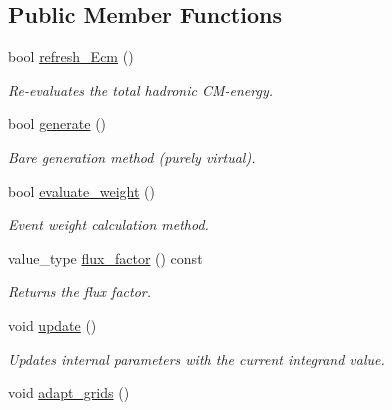 \subsection*{Public Member Functions}
\begin{DoxyCompactItemize}
\item 
\hypertarget{a00263_a43bb6829df157ce9165fc076aa86c6b3}{}bool \hyperlink{a00263_a43bb6829df157ce9165fc076aa86c6b3}{refresh\+\_\+\+Ecm} ()\label{a00263_a43bb6829df157ce9165fc076aa86c6b3}

\begin{DoxyCompactList}\small\item\em Re-\/evaluates the total hadronic C\+M-\/energy. \end{DoxyCompactList}\item 
bool \hyperlink{a00263_aca3cda0f673678362fbf0300fbbc3357}{generate} ()
\begin{DoxyCompactList}\small\item\em \textquotesingle{}Bare generation\textquotesingle{} method (purely virtual). \end{DoxyCompactList}\item 
\hypertarget{a00263_a439c9559e576d22aeffb909bfa0a5269}{}bool \hyperlink{a00263_a439c9559e576d22aeffb909bfa0a5269}{evaluate\+\_\+weight} ()\label{a00263_a439c9559e576d22aeffb909bfa0a5269}

\begin{DoxyCompactList}\small\item\em Event weight calculation method. \end{DoxyCompactList}\item 
\hypertarget{a00263_a6edfec759eeffecc246c8cfec297c5f2}{}value\+\_\+type \hyperlink{a00263_a6edfec759eeffecc246c8cfec297c5f2}{flux\+\_\+factor} () const \label{a00263_a6edfec759eeffecc246c8cfec297c5f2}

\begin{DoxyCompactList}\small\item\em Returns the flux factor. \end{DoxyCompactList}\item 
\hypertarget{a00263_a0ac611745ab0778bac2b3d895d5fdee9}{}void \hyperlink{a00263_a0ac611745ab0778bac2b3d895d5fdee9}{update} ()\label{a00263_a0ac611745ab0778bac2b3d895d5fdee9}

\begin{DoxyCompactList}\small\item\em Updates internal parameters with the current integrand value. \end{DoxyCompactList}\item 
\hypertarget{a00263_aaa5b14203b9dc64944b3968efacb0842}{}void \hyperlink{a00263_aaa5b14203b9dc64944b3968efacb0842}{adapt\+\_\+grids} ()\label{a00263_aaa5b14203b9dc64944b3968efacb0842}


\end{DoxyCompactItemize}
